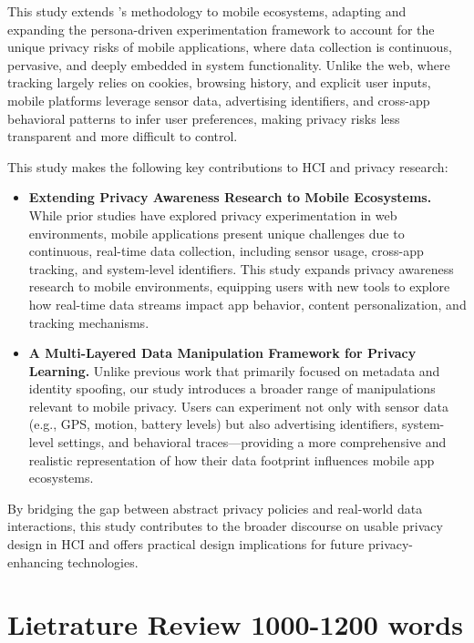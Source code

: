 \documentclass[acmlarge, nonacm]{acmart}
\begin{document}
This study extends \citet{Chaoran2023EmpathySandbox}'s methodology to mobile ecosystems, adapting and expanding the persona-driven experimentation framework to account for the unique privacy risks of mobile applications, where data collection is continuous, pervasive, and deeply embedded in system functionality. Unlike the web, where tracking largely relies on cookies, browsing history, and explicit user inputs, mobile platforms leverage sensor data, advertising identifiers, and cross-app behavioral patterns to infer user preferences, making privacy risks less transparent and more difficult to control.

This study makes the following key contributions to HCI and privacy research:
\begin{itemize}
    \item 

    \textbf{Extending Privacy Awareness Research to Mobile Ecosystems.}
While prior studies have explored privacy experimentation in web environments, mobile applications present unique challenges due to continuous, real-time data collection, including sensor usage, cross-app tracking, and system-level identifiers. This study expands privacy awareness research to mobile environments, equipping users with new tools to explore how real-time data streams impact app behavior, content personalization, and tracking mechanisms.
    
    \item \textbf{A Multi-Layered Data Manipulation Framework for Privacy Learning.}
Unlike previous work that primarily focused on metadata and identity spoofing, our study introduces a broader range of manipulations relevant to mobile privacy. Users can experiment not only with sensor data (e.g., GPS, motion, battery levels) but also advertising identifiers, system-level settings, and behavioral traces—providing a more comprehensive and realistic representation of how their data footprint influences mobile app ecosystems.
\end{itemize}

By bridging the gap between abstract privacy policies and real-world data interactions, this study contributes to the broader discourse on usable privacy design in HCI and offers practical design implications for future privacy-enhancing technologies.

\section{Lietrature Review 1000-1200 words}
\end{document}
